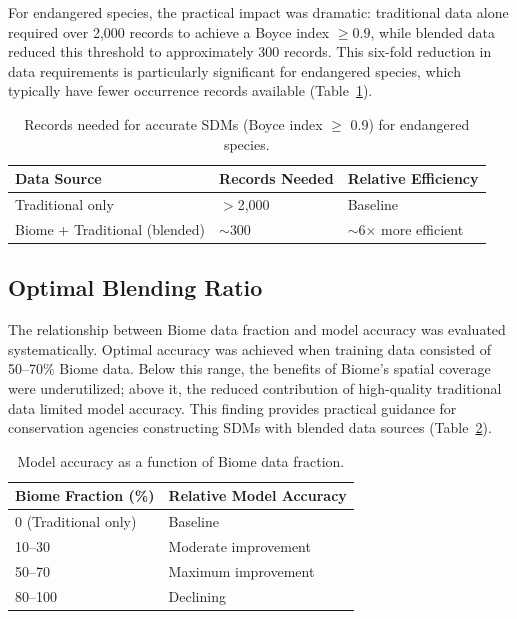 \documentclass[11pt]{article}
\begin{document}
For endangered species, the practical impact was dramatic: traditional data alone required over 2,000 records to achieve a Boyce index $\geq 0.9$, while blended data reduced this threshold to approximately 300 records. This six-fold reduction in data requirements is particularly significant for endangered species, which typically have fewer occurrence records available (Table~\ref{tab:threshold}).

\begin{table}[htbp]
\centering
\caption{Records needed for accurate SDMs (Boyce index $\geq$ 0.9) for endangered species.}
\label{tab:threshold}
\begin{tabular}{lll}
\toprule
Data Source & Records Needed & Relative Efficiency \\
\midrule
Traditional only & $>$2,000 & Baseline \\
Biome + Traditional (blended) & $\sim$300 & $\sim$6$\times$ more efficient \\
\bottomrule
\end{tabular}
\end{table}

\subsection{Optimal Blending Ratio}

The relationship between Biome data fraction and model accuracy was evaluated systematically. Optimal accuracy was achieved when training data consisted of 50--70\% Biome data. Below this range, the benefits of Biome's spatial coverage were underutilized; above it, the reduced contribution of high-quality traditional data limited model accuracy. This finding provides practical guidance for conservation agencies constructing SDMs with blended data sources (Table~\ref{tab:blending}).

\begin{table}[htbp]
\centering
\caption{Model accuracy as a function of Biome data fraction.}
\label{tab:blending}
\begin{tabular}{ll}
\toprule
Biome Fraction (\%) & Relative Model Accuracy \\
\midrule
0 (Traditional only) & Baseline \\
10--30 & Moderate improvement \\
50--70 & Maximum improvement \\
80--100 & Declining \\
\bottomrule
\end{tabular}
\end{table}
\end{document}
